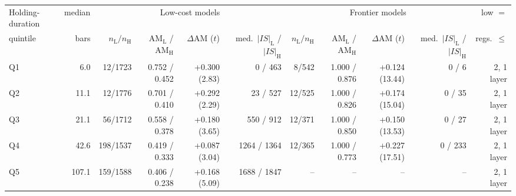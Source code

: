 \begin{tabular}{lrrrrrrrrrr}
\toprule
Holding-duration & median & \multicolumn{4}{c}{Low-cost models} & \multicolumn{4}{c}{Frontier models} & low $=$ \\
\cmidrule(lr){3-6}\cmidrule(lr){7-10}
quintile & bars & $n_{\mathrm{L}}/n_{\mathrm{H}}$ & AM$_{\mathrm{L}}$ / AM$_{\mathrm{H}}$ & $\Delta$AM ($t$) & med.\ $|IS|_{\mathrm{L}}$ / $|IS|_{\mathrm{H}}$ & $n_{\mathrm{L}}/n_{\mathrm{H}}$ & AM$_{\mathrm{L}}$ / AM$_{\mathrm{H}}$ & $\Delta$AM ($t$) & med.\ $|IS|_{\mathrm{L}}$ / $|IS|_{\mathrm{H}}$ & regs.\ $\le$ \\
\midrule
Q1 & 6.0 & 12/1723 & 0.752 / 0.452 & +0.300 (2.83) & 0 / 463 & 8/542 & 1.000 / 0.876 & +0.124 (13.44) & 0 / 6 & 2, 1 layer \\
Q2 & 11.1 & 12/1776 & 0.701 / 0.410 & +0.292 (2.29) & 23 / 527 & 12/525 & 1.000 / 0.826 & +0.174 (15.04) & 0 / 35 & 2, 1 layer \\
Q3 & 21.1 & 56/1712 & 0.558 / 0.378 & +0.180 (3.65) & 550 / 912 & 12/371 & 1.000 / 0.850 & +0.150 (13.53) & 0 / 27 & 2, 1 layer \\
Q4 & 42.6 & 198/1537 & 0.419 / 0.333 & +0.087 (3.04) & 1264 / 1364 & 12/365 & 1.000 / 0.773 & +0.227 (17.51) & 0 / 233 & 2, 1 layer \\
Q5 & 107.1 & 159/1588 & 0.406 / 0.238 & +0.168 (5.09) & 1688 / 1847 & -- & -- & -- & -- & 2, 1 layer \\
\bottomrule
\end{tabular}
